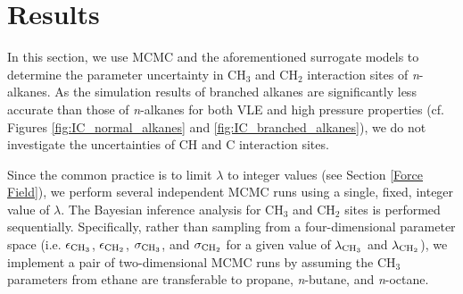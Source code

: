 \documentclass[preprint,letterpaper,floatfix,citeautoscript,aip,jcp]{revtex4-1}
\begin{document}
\section{Results} \label{Results}



%
%
%

In this section, we use MCMC and the aforementioned surrogate models to determine the parameter uncertainty in CH$_3$ and CH$_2$ interaction sites of \textit{n}-alkanes. As the simulation results of branched alkanes are significantly less accurate than those of \textit{n}-alkanes for both VLE and high pressure properties (cf. Figures \ref{fig:IC_normal_alkanes} and \ref{fig:IC_branched_alkanes}), we do not investigate the uncertainties of CH and C interaction sites. 


Since the common practice is to limit $\lambda$ to integer values (see Section \ref{Force Field}), we perform several independent MCMC runs using a single, fixed, integer value of $\lambda$. The Bayesian inference analysis for CH$_3$ and CH$_2$ sites is performed sequentially. Specifically, rather than sampling from a four-dimensional parameter space (i.e. $\epsilon_{\rm CH_3}$, $\epsilon_{\rm CH_2}$, $\sigma_{\rm CH_3}$, and $\sigma_{\rm CH_2}$ for a given value of $\lambda_{\rm CH_3}$ and $\lambda_{\rm CH_2}$), we implement a pair of two-dimensional MCMC runs by assuming the CH$_3$ parameters from ethane are transferable to propane, \textit{n}-butane, and \textit{n}-octane. 
\end{document}
